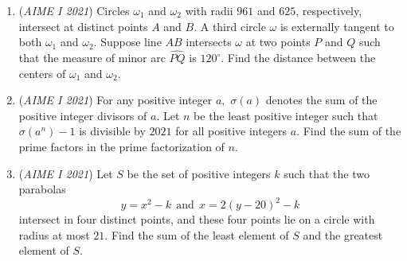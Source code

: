 \begin{enumerate}
 

	\item (\textit{AIME I 2021}) Circles $\omega_1$ and $\omega_2$ with radii $961$ and $625$, respectively, intersect at distinct points $A$ and $B$. A third circle $\omega$ is externally tangent to both $\omega_1$ and $\omega_2$. Suppose line $AB$ intersects $\omega$ at two points $P$ and $Q$ such that the measure of minor arc $\widehat{PQ}$ is $120^{\circ}$. Find the distance between the centers of $\omega_1$ and $\omega_2$.


 

	\item (\textit{AIME I 2021}) For any positive integer $a,$ $\sigma(a)$ denotes the sum of the positive integer divisors of $a$. Let $n$ be the least positive integer such that $\sigma(a^n)-1$ is divisible by $2021$ for all positive integers $a$. Find the sum of the prime factors in the prime factorization of $n$.


 

	\item (\textit{AIME I 2021}) Let $S$ be the set of positive integers $k$ such that the two parabolas
 \[y=x^2-k~~\text{and}~~x=2(y-20)^2-k\]intersect in four distinct points, and these four points lie on a circle with radius at most $21$. Find the sum of the least element of $S$ and the greatest element of $S$.


 

\end{enumerate}